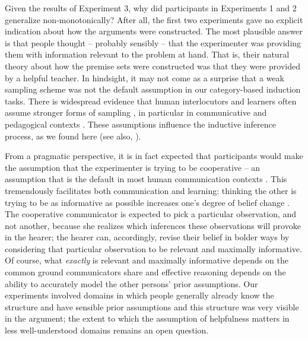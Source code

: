 \documentclass[authoryear,11pt]{elsarticle}
\begin{document}
Given the results of Experiment 3, why did participants in Experiments 1 and 2 generalize non-monotonically? After all, the first two experiments gave no explicit indication about how the arguments were constructed. The most plausible answer is that people thought -- probably sensibly -- that the experimenter was providing them with information relevant to the problem at hand. That is, their natural theory about how the premise sets were constructed was that they were provided by a helpful teacher. In hindsight, it may not come as a surprise that a weak sampling scheme was not the default assumption in our category-based induction tasks. There is widespread evidence that human interlocutors and learners often assume stronger forms of sampling \citep{SanjanaTenenbaum2003,Vanderhenstetal2002, XuTenenbaum2007}, in particular in communicative \citep{GoodmanStuhlmuller2013} and pedagogical contexts \citep{Shaftoetal2014}. These assumptions influence the inductive inference process, as we found here (see also, \citealt{Fernbach2006, LawsonKalish2009, Navarroetal2012, Vanderhenstetal2002cogsci, Vongetal2013, Shaftoetal2014, Ransometalsubmitted}).

From a pragmatic perspective, it is in fact expected that participants would make the assumption that the experimenter is trying to be cooperative -- an assumption that is the default in most human communication contexts \citep{FrankGoodman2012, Grice1989, Levinson1995}. This tremendously facilitates both communication and learning: thinking the other is trying to be as informative as possible increases one's degree of belief change \citep{SperberWilson1995}. The cooperative communicator is expected to pick a particular observation, and not another, because she realizes which inferences these observations will provoke in the hearer; the hearer can, accordingly, revise their belief in bolder ways by considering that particular observation to be relevant and maximally informative. Of course, what {\it exactly} is relevant and maximally informative depends on the common ground communicators share and effective reasoning depends on the ability to accurately model the other persons' prior assumptions. Our experiments involved domains in which people generally already know the structure and have sensible prior assumptions and this structure was very visible in the argument; the extent to which the assumption of helpfulness matters in less well-understood domains remains an open question.
\end{document}

